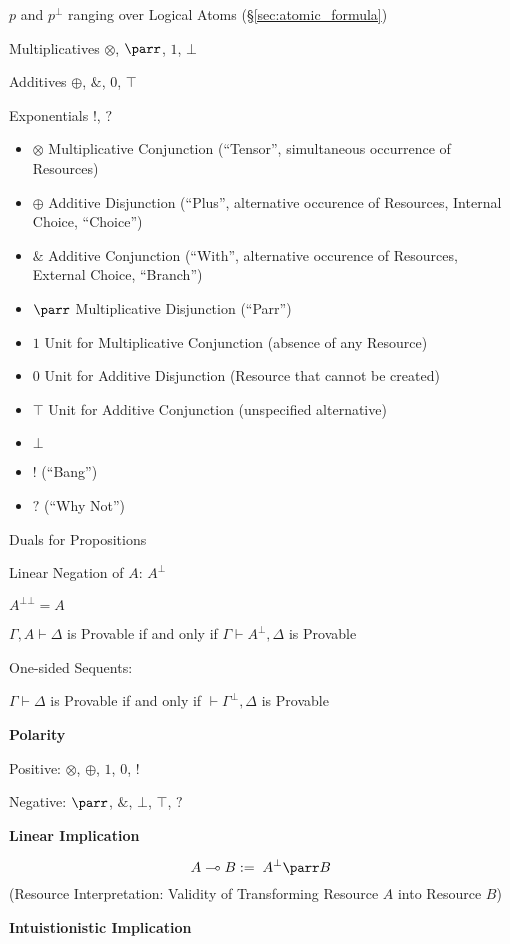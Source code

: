 $p$ and $p^\bot$ ranging over Logical Atoms
(\S\ref{sec:atomic_formula})

Multiplicatives $\otimes$, $\parr$, $1$, $\bot$

Additives $\oplus$, $\&$, $0$, $\top$

Exponentials $!$, $?$

\begin{itemize}
  \item $\otimes$ Multiplicative Conjunction (``Tensor'', simultaneous
    occurrence of Resources)
  \item $\oplus$ Additive Disjunction (``Plus'', alternative occurence
    of Resources, Internal Choice, ``Choice'')
  \item $\&$ Additive Conjunction (``With'', alternative occurence of
    Resources, External Choice, ``Branch'')
  \item $\parr$ Multiplicative Disjunction (``Parr'')
  \item $1$ Unit for Multiplicative Conjunction (absence of any
    Resource)
  \item $0$ Unit for Additive Disjunction (Resource that cannot be
    created)
  \item $\top$ Unit for Additive Conjunction (unspecified alternative)
  \item $\bot$
  \item $!$ (``Bang'')
  \item $?$ (``Why Not'')
\end{itemize}

Duals for Propositions %

Linear Negation of $A$: $A^\bot$

$A^{\bot\bot} = A$

\cite{llwiki16}
$\Gamma, A \vdash \Delta$ is Provable if and only if $\Gamma \vdash
A^\bot, \Delta$ is Provable

One-sided Sequents:

$\Gamma \vdash \Delta$ is Provable if and only if $\vdash \Gamma^\bot,
\Delta$ is Provable


\textbf{Polarity}

Positive: $\otimes$, $\oplus$, $1$, $0$, $!$

Negative: $\parr$, $\&$, $\bot$, $\top$, $?$


\textbf{Linear Implication}

\[
  A \multimap B := \; A^{\bot} \parr B
\]
(Resource Interpretation: Validity of Transforming Resource $A$ into
Resource $B$)


\textbf{Intuistionistic Implication}

